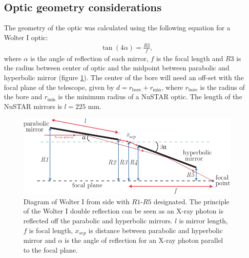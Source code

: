 \subsection{Optic geometry considerations}
The geometry of the optic was calculated using the following equation for a Wolter I optic:
\begin{eqnarray}\label{eq:wolter}
  \tan(4\alpha) = \frac{\mathit{R3}}{f},
\end{eqnarray}
where $\alpha$ is the angle of reflection of each mirror, $f$ is the focal length and $\mathit{R3}$ is the radius between center of optic and the midpoint between parabolic and hyperbolic mirror (figure \ref{fig:wolter1-diagram}). The center of the bore will need an off-set with the focal plane of the telescope, given by $d = r_{\text{bore}} + r_{\text{min}}$, where $r_{\text{bore}}$ is the radius of the bore and $r_{\text{min}}$ is the minimum radius of a NuSTAR optic. The length of the NuSTAR mirrors is $l = 225$ mm.
\begin{figure}[htbp]
  \centering
    \includegraphics[width=0.95\linewidth]{figures/cast/wolter1-diagram.pdf}
  \caption{\footnotesize Diagram of Wolter I from side with $\mathit{R1}$-$\mathit{R5}$ designated. The principle of the Wolter I double reflection can be seen as an X-ray photon is reflected off the parabolic and hyperbolic mirrors. $l$ is mirror length, $f$ is focal length, $x_{sep}$ is distance between parabolic and hyperbolic mirror and $\alpha$ is the angle of reflection for an X-ray photon parallel to the focal plane.}
  \label{fig:wolter1-diagram}
\end{figure}

